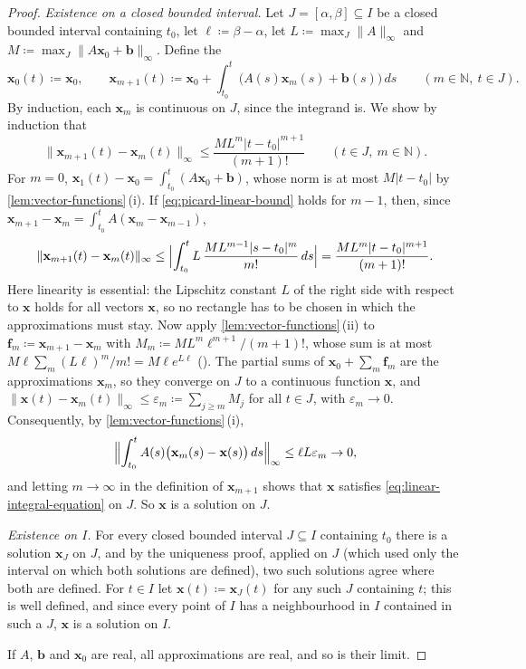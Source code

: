 \begin{proof}
\emph{Existence on a closed bounded interval.} Let $J=[\alpha,\beta]\subseteq I$ be a closed bounded interval containing $t_0$, let $\ell\coloneqq\beta-\alpha$, let $L\coloneqq\max_J\|A\|_\infty$ and $M\coloneqq\max_J\|A\mathbf x_0+\mathbf b\|_\infty$. Define the 
\[
\mathbf x_0(t)\coloneqq\mathbf x_0,\qquad\mathbf x_{m+1}(t)\coloneqq\mathbf x_0+\int_{t_0}^t\bigl(A(s)\mathbf x_m(s)+\mathbf b(s)\bigr)\,ds\qquad(m\in\mathbb N,\ t\in J).
\]
By induction, each $\mathbf x_m$ is continuous on $J$, since the integrand is. We show by induction that
\begin{equation}
\|\mathbf x_{m+1}(t)-\mathbf x_m(t)\|_\infty\le\frac{ML^m|t-t_0|^{m+1}}{(m+1)!}\qquad(t\in J,\ m\in\mathbb N).
\label{eq:picard-linear-bound}
\end{equation}
For $m=0$, $\mathbf x_1(t)-\mathbf x_0=\int_{t_0}^t(A\mathbf x_0+\mathbf b)$, whose norm is at most $M|t-t_0|$ by \cref{lem:vector-functions}\,(i). If \eqref{eq:picard-linear-bound} holds for $m-1$, then, since $\mathbf x_{m+1}-\mathbf x_m=\int_{t_0}^tA(\mathbf x_m-\mathbf x_{m-1})$,
\[
\|\mathbf x_{m+1}(t)-\mathbf x_m(t)\|_\infty\le\Bigl|\int_{t_0}^tL\,\frac{ML^{m-1}|s-t_0|^m}{m!}\,ds\Bigr|=\frac{ML^m|t-t_0|^{m+1}}{(m+1)!} .
\]
Here linearity is essential: the Lipschitz constant $L$ of the right side with respect to $\mathbf x$ holds for all vectors $\mathbf x$, so no rectangle has to be chosen in which the approximations must stay. Now apply \cref{lem:vector-functions}\,(ii) to $\mathbf f_m\coloneqq\mathbf x_{m+1}-\mathbf x_m$ with $M_m\coloneqq ML^m\ell^{m+1}/(m+1)!$, whose sum is at most $M\ell\sum_m(L\ell)^m/m!=M\ell e^{L\ell}$ (). The partial sums of $\mathbf x_0+\sum_m\mathbf f_m$ are the approximations $\mathbf x_m$, so they converge on $J$ to a continuous function $\mathbf x$, and $\|\mathbf x(t)-\mathbf x_m(t)\|_\infty\le\varepsilon_m\coloneqq\sum_{j\ge m}M_j$ for all $t\in J$, with $\varepsilon_m\to0$. Consequently, by \cref{lem:vector-functions}\,(i),
\[
\Bigl\|\int_{t_0}^tA(s)\bigl(\mathbf x_m(s)-\mathbf x(s)\bigr)\,ds\Bigr\|_\infty\le\ell L\varepsilon_m\to0 ,
\]
and letting $m\to\infty$ in the definition of $\mathbf x_{m+1}$ shows that $\mathbf x$ satisfies \eqref{eq:linear-integral-equation} on $J$. So $\mathbf x$ is a solution on $J$.

\emph{Existence on $I$.} For every closed bounded interval $J\subseteq I$ containing $t_0$ there is a solution $\mathbf x_J$ on $J$, and by the uniqueness proof, applied on $J$ (which used only the interval on which both solutions are defined), two such solutions agree where both are defined. For $t\in I$ let $\mathbf x(t)\coloneqq\mathbf x_J(t)$ for any such $J$ containing $t$; this is well defined, and since every point of $I$ has a neighbourhood in $I$ contained in such a $J$, $\mathbf x$ is a solution on $I$.

If $A$, $\mathbf b$ and $\mathbf x_0$ are real, all approximations are real, and so is their limit.
\end{proof}

